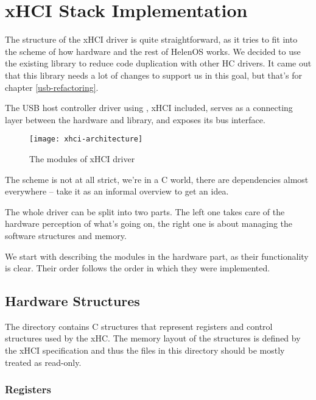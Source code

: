 \chapter{xHCI Stack Implementation}

The structure of the xHCI driver is quite straightforward, as it tries to fit
into the scheme of how hardware and the rest of HelenOS works. We decided to
use the existing library  to reduce code duplication with
other HC drivers. It came out that this library needs a lot of changes to
support us in this goal, but that's for chapter \ref{usb-refactoring}.

The USB host controller driver using , xHCI included, serves as
a connecting layer between the hardware and library, and exposes its bus
interface.

\begin{figure}[h]
	\centering
	\texttt{[image: xhci-architecture]}
	\caption{The modules of xHCI driver}
\end{figure}

The scheme is not at all strict, we're in a C world, there are dependencies
almost everywhere -- take it as an informal overview to get an idea.

The whole driver can be split into two parts. The left one takes care of the
hardware perception of what's going on, the right one is about managing the
software structures and memory.

We start with describing the modules in the hardware part, as their
functionality is clear. Their order follows the order in which they were
implemented.

\section{Hardware Structures}

The  directory contains C structures
that represent registers and control structures used by the xHC. The memory layout of the
structures is defined by the xHCI specification and thus the files in this directory should
be mostly treated as read-only.

\subsection{Registers}

